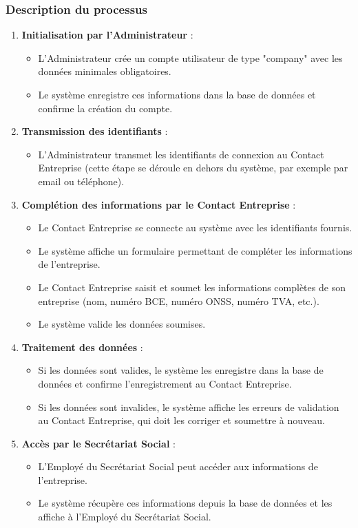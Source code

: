 \documentclass[12pt,a4paper]{report}
\begin{document}
\subsubsection{Description du processus}

\begin{enumerate}
  \item \textbf{Initialisation par l'Administrateur} :
    \begin{itemize}
      \item L'Administrateur crée un compte utilisateur de type "company" avec les données minimales obligatoires.
      \item Le système enregistre ces informations dans la base de données et confirme la création du compte.
    \end{itemize}

  \item \textbf{Transmission des identifiants} :
    \begin{itemize}
      \item L'Administrateur transmet les identifiants de connexion au Contact Entreprise (cette étape se déroule en dehors du système, par exemple par email ou téléphone).
    \end{itemize}

  \item \textbf{Complétion des informations par le Contact Entreprise} :
    \begin{itemize}
      \item Le Contact Entreprise se connecte au système avec les identifiants fournis.
      \item Le système affiche un formulaire permettant de compléter les informations de l'entreprise.
      \item Le Contact Entreprise saisit et soumet les informations complètes de son entreprise (nom, numéro BCE, numéro ONSS, numéro TVA, etc.).
      \item Le système valide les données soumises.
    \end{itemize}

  \item \textbf{Traitement des données} :
    \begin{itemize}
      \item Si les données sont valides, le système les enregistre dans la base de données et confirme l'enregistrement au Contact Entreprise.
      \item Si les données sont invalides, le système affiche les erreurs de validation au Contact Entreprise, qui doit les corriger et soumettre à nouveau.
    \end{itemize}

  \item \textbf{Accès par le Secrétariat Social} :
    \begin{itemize}
      \item L'Employé du Secrétariat Social peut accéder aux informations de l'entreprise.
      \item Le système récupère ces informations depuis la base de données et les affiche à l'Employé du Secrétariat Social.
    \end{itemize}
\end{enumerate}
\end{document}
